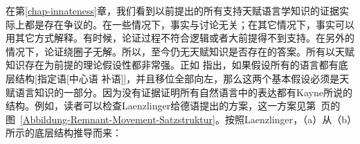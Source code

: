 在第\ref{chap-innateness}章，我们看到以前提出的所有支持天赋语言学知识的证据实际上都是存在争议的。在一些情况下，事实与讨论无关；在其它情况下，事实可以用其它方式解释。有时候，论证过程不符合逻辑或者大前提得不到支持。在另外的情况下，论证绕圈子无解。所以，至今仍无天赋知识是否存在的答案。所有以天赋知识存在为前提的理论假设性都非常强。正如 \citet{Kayne94a-u}指出，如果假设所有的语言都有底层结构[指定语[中心语 补语]]，并且移位全部向左，那么这两个基本假设必须是天赋语言知识的一部分。因为没有证据证明所有自然语言中的表达都有Kayne所说的结构。例如，读者可以检查Laenzlinger给德语提出的方案\citeyearpar[]{Laenzlinger2004a}，这一方案见第~\pageref{Abbildung-Remnant-Movement-Satzstruktur}页的图~\ref{Abbildung-Remnant-Movement-Satzstruktur}。按照Laenzlinger，（a）从（b）所示的底层结构推导而来：
\eal
{}
